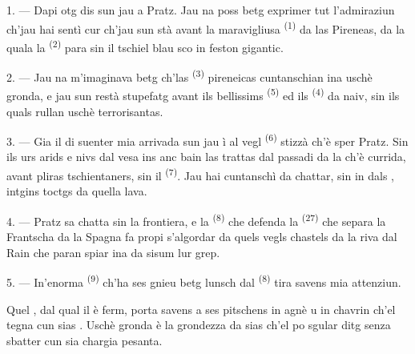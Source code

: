 \VUsaut{4.0mm}
\VUsaut{3.0mm}

\VUsaut{3.0mm}

\VUsaut{3.0mm}

1. --- Dapi otg dis sun jau a Pratz. Jau na poss betg exprimer tut l'admiraziun
ch'jau hai sentì cur ch'jau sun stà avant la maravigliusa 
\textsuperscript{(1)} da las Pireneas, da la quala la 
\textsuperscript{(2)} para sin il tschiel blau sco in feston gigantic.

2. --- Jau na m'imaginava betg ch'las  \textsuperscript{(3)} pireneicas
cuntanschian ina  uschè gronda, e jau sun restà stupefatg avant ils
bellissims  \textsuperscript{(5)} ed ils 
\textsuperscript{(4)} da naiv, sin ils quals rullan  uschè terrorisantas.

\VUsaut{3.0mm}
\VUsaut{3.0mm}

3. --- Gia il di suenter mia arrivada sun jau ì al vegl 
\textsuperscript{(6)} stizzà ch'è sper Pratz. Sin ils urs arids e nivs dal
 vesa ins anc bain las trattas dal passadi da la  ch'è
currida, avant pliras tschientaners, sin il 
\textsuperscript{(7)}. Jau hai cuntanschì da chattar, sin in dals ,
intgins toctgs da quella lava.

4. --- Pratz sa chatta sin la frontiera, e la  \textsuperscript{(8)} che
defenda la  \textsuperscript{(27)} che separa la Frantscha da la Spagna fa
propi s'algordar da quels vegls chastels da la riva dal Rain che paran spiar ina
 da sisum lur grep.

5. --- In'enorma  \textsuperscript{(9)} ch'ha ses gnieu betg lunsch dal
 \textsuperscript{(8)} tira savens mia attenziun.

Quel , dal qual il  è ferm, porta savens a ses
pitschens in agnè u in chavrin ch'el tegna cun sias . Uschè gronda è la
grondezza da sias  ch'el po sgular ditg senza sbatter cun sia chargia
pesanta.

